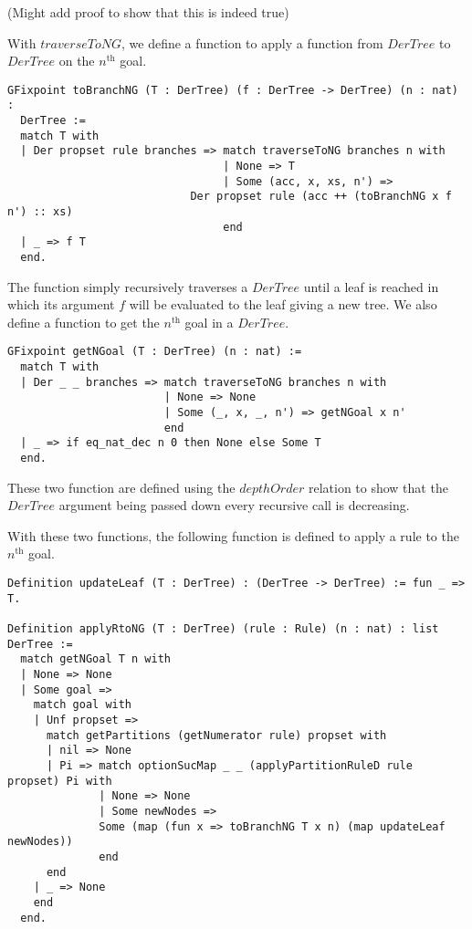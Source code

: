 \documentclass{article}
\begin{document}
(Might add proof to show that this is indeed true)

With $traverseToNG$, we define a function to apply a function from $DerTree$ to
$DerTree$ on the $n^{\text{th}}$ goal.

\begin{lstlisting}
GFixpoint toBranchNG (T : DerTree) (f : DerTree -> DerTree) (n : nat) :
  DerTree :=
  match T with
  | Der propset rule branches => match traverseToNG branches n with
                                 | None => T
                                 | Some (acc, x, xs, n') =>
                            Der propset rule (acc ++ (toBranchNG x f n') :: xs)
                                 end
  | _ => f T
  end.
\end{lstlisting}

The function simply recursively traverses a $DerTree$ until a leaf is reached
in which its argument $f$ will be evaluated to the leaf giving a new tree.
We also define a function to get the $n^{\text{th}}$ goal in a $DerTree$.

\begin{lstlisting}
GFixpoint getNGoal (T : DerTree) (n : nat) :=
  match T with
  | Der _ _ branches => match traverseToNG branches n with
                        | None => None
                        | Some (_, x, _, n') => getNGoal x n'
                        end
  | _ => if eq_nat_dec n 0 then None else Some T
  end.
\end{lstlisting}

These two function are defined using the $depthOrder$ relation to show that the
$DerTree$ argument being passed down every recursive call is decreasing.

With these two functions, the following function is defined to apply a rule to
the $n^{\text{th}}$ goal.

\begin{lstlisting}
Definition updateLeaf (T : DerTree) : (DerTree -> DerTree) := fun _ => T.

Definition applyRtoNG (T : DerTree) (rule : Rule) (n : nat) : list DerTree :=
  match getNGoal T n with
  | None => None
  | Some goal => 
    match goal with
    | Unf propset =>
      match getPartitions (getNumerator rule) propset with
      | nil => None
      | Pi => match optionSucMap _ _ (applyPartitionRuleD rule propset) Pi with
              | None => None
              | Some newNodes =>
              Some (map (fun x => toBranchNG T x n) (map updateLeaf newNodes))
              end
      end
    | _ => None
    end
  end.
\end{lstlisting}
\end{document}
